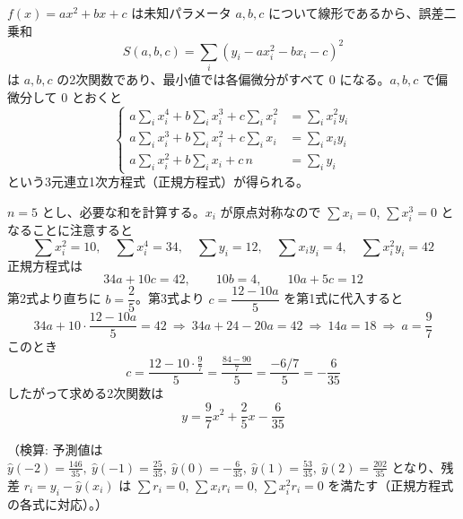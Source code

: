 
$f(x) = ax^2+bx+c$ は未知パラメータ $a,b,c$ について線形であるから、誤差二乗和
\[
S(a,b,c) = \sum_i (y_i - ax_i^2 - bx_i - c)^2
\]
は $a,b,c$ の2次関数であり、最小値では各偏微分がすべて $0$ になる。$a,b,c$ で偏微分して $0$ とおくと
\[
\left\{
\begin{aligned}
a\sum_i x_i^4 + b\sum_i x_i^3 + c\sum_i x_i^2 &= \sum_i x_i^2 y_i \\
a\sum_i x_i^3 + b\sum_i x_i^2 + c\sum_i x_i &= \sum_i x_i y_i \\
a\sum_i x_i^2 + b\sum_i x_i + c\, n &= \sum_i y_i
\end{aligned}
\right.
\]
という3元連立1次方程式（正規方程式）が得られる。

$n=5$ とし、必要な和を計算する。$x_i$ が原点対称なので $\sum x_i = 0$, $\sum x_i^3 = 0$ となることに注意すると
\[
\sum x_i^2 = 10,\quad \sum x_i^4 = 34,\quad \sum y_i = 12,\quad \sum x_i y_i = 4,\quad \sum x_i^2 y_i = 42
\]
正規方程式は
\[
34a + 10c = 42, \qquad 10b = 4, \qquad 10a + 5c = 12
\]
第2式より直ちに $b = \dfrac{2}{5}$。第3式より $c = \dfrac{12 - 10a}{5}$ を第1式に代入すると
\[
34a + 10\cdot\frac{12-10a}{5} = 42 \ \Longrightarrow\ 34a + 24 - 20a = 42 \ \Longrightarrow\ 14a = 18 \ \Longrightarrow\ a = \frac{9}{7}
\]
このとき
\[
c = \frac{12 - 10\cdot\frac{9}{7}}{5} = \frac{\frac{84-90}{7}}{5} = \frac{-6/7}{5} = -\frac{6}{35}
\]
したがって求める2次関数は
\[
\boxed{\; y = \frac{9}{7}x^2 + \frac{2}{5}x - \frac{6}{35} \;}
\]

（検算: 予測値は $\hat y(-2)=\frac{146}{35},\ \hat y(-1)=\frac{25}{35},\ \hat y(0)=-\frac{6}{35},\ \hat y(1)=\frac{53}{35},\ \hat y(2)=\frac{202}{35}$ となり、残差 $r_i=y_i-\hat y(x_i)$ は $\sum r_i = 0$, $\sum x_i r_i = 0$, $\sum x_i^2 r_i = 0$ を満たす（正規方程式の各式に対応）。）
